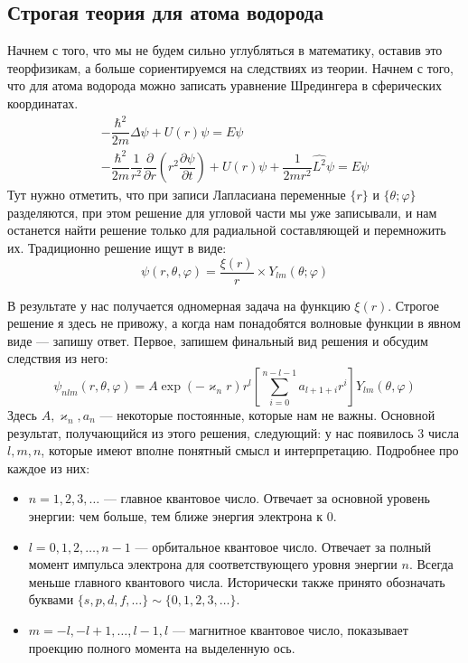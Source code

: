 \documentclass[12pt]{article}
\begin{document}
\subsection{Строгая теория для атома водорода}
Начнем с того, что мы не будем сильно углубляться в математику, оставив это теорфизикам, а больше сориентируемся на следствиях из теории. Начнем с того, что для атома водорода можно записать уравнение Шредингера в сферических координатах. 
\begin{gather}
\label{eq:sem_06_schrodinger_atom}
    -\dfrac{\hbar^2}{2m}\Delta\psi + U(r)\psi = E\psi\\
    -\dfrac{\hbar^2}{2m}\dfrac{1}{r^2}\dfrac{\partial}{\partial r}\left( r^2 \dfrac{\partial\psi}{\partial t}\right) + U(r)\psi +\dfrac{1}{2mr^2}\hat{L^2}\psi = E\psi
\end{gather}
Тут нужно отметить, что при записи Лапласиана переменные $\{r\}$ и $\{\theta; \varphi\}$ разделяются, при этом решение для угловой части мы уже записывали, и нам останется найти решение только для радиальной составляющей и перемножить их. Традиционно решение ищут в виде:
\begin{equation*}
    \psi(r, \theta, \varphi) = \dfrac{\xi(r)}{r}\times Y_{lm}(\theta; \varphi)
\end{equation*}

В результате у нас получается одномерная задача на функцию $\xi(r)$. Строгое решение я здесь не привожу, а когда нам понадобятся волновые функции в явном виде --- запишу ответ.
Первое, запишем финальный вид решения и обсудим следствия из него:
\begin{equation*}
    \psi_{nlm}(r, \theta, \varphi) = A \exp{(-\varkappa_n r)}r^l\left[\sum\limits_{i=0}^{n-l-1}a_{l+1+i}r^i\right]Y_{lm}(\theta, \varphi)
\end{equation*}
Здесь $A, \varkappa_n, a_n$ --- некоторые постоянные, которые нам не важны. Основной результат, получающийся из этого решения, следующий: у нас появилось 3 числа $l,m,n$, которые имеют вполне понятный смысл и интерпретацию. Подробнее про каждое из них:
\begin{itemize}
    \item $n = 1, 2, 3, \dots $ --- главное квантовое число. Отвечает за основной уровень энергии: чем больше, тем ближе энергия электрона к 0.
    \item $l = 0, 1, 2, \dots, n-1$ --- орбитальное квантовое число. Отвечает за полный момент импульса электрона для соответствующего уровня энергии $n$. Всегда меньше главного квантового числа. Исторически также принято обозначать буквами $\{s,p,d,f, \dots \} \sim \{0,1,2,3, \dots\}$.
    \item $m = -l, -l+1, \dots, l-1, l$ --- магнитное квантовое число, показывает проекцию полного момента на выделенную ось.
\end{itemize}
\end{document}
